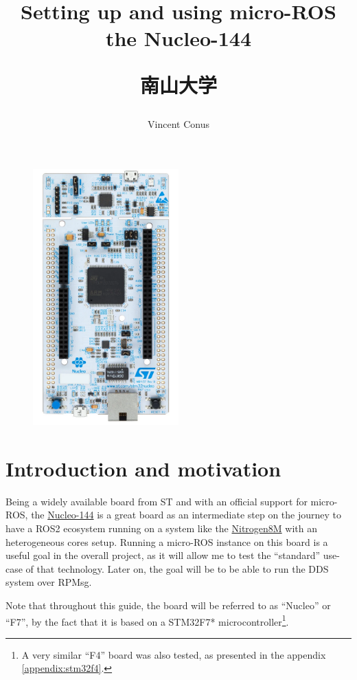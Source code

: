 \documentclass[10pt]{article}
\title{Setting up and using micro-ROS the Nucleo-144 \\[1ex] \large \begin{CJK}{UTF8}{min}南山大学\end{CJK}}
\date{}
\author{Vincent Conus}
\begin{document}
 
\maketitle

\begin{figure}[H]
  \centering
  \includegraphics[width=0.5\textwidth]{./img/board.png}
\end{figure}

\pagebreak
\tableofcontents

\pagebreak
\section{Introduction and motivation}
Being a widely available board from ST and with an official support for micro-ROS, the \href{https://www.st.com/en/evaluation-tools/nucleo-f429zi.html}{Nucleo-144} is a great board as an intermediate step on the journey to have a ROS2 ecosystem running on a system like the \href{https://gitlab.com/nitrogen8m/documentation}{Nitrogen8M} with an heterogeneous cores setup.
Running a micro-ROS instance on this board is a useful goal in the overall project, as it will
allow me to test the ``standard'' use-case of that technology.
Later on, the goal will be to be able to run the DDS system over RPMsg.

Note that throughout this guide, the board will be referred to as ``Nucleo'' or ``F7'', by the fact that it is based on a STM32F7* microcontroller\footnote{A very similar ``F4'' board was also tested, as presented in the appendix \ref{appendix:stm32f4}.}.
\end{document}
